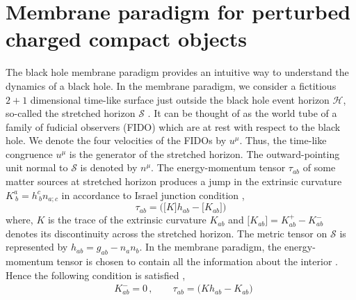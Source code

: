 \documentclass[aps,prd,twocolumn,floatfix,noshowpacs,tightenlines,noshowkeys,superscriptaddress,amsmath,amssymb,
nofootinbib]{revtex4-1}
\renewcommand\[{\begin{equation}}
\renewcommand\]{\end{equation}}
\begin{document}
 
\section{Membrane paradigm for perturbed charged compact objects}\label{Sec_Membrane}


The black hole membrane paradigm provides an intuitive way to understand the dynamics of a black hole. In the membrane paradigm, we consider a fictitious $2+1$ dimensional time-like surface just outside the black hole event horizon 
$\mathcal{H}$, so-called the stretched horizon $\mathcal{S}$ \cite{1982mgm..conf..587D, Thorne, MacDonald:1982zz, PhysRevD.33.915}. It can be thought of as the world tube of a family of fudicial observers (FIDO) which are at rest with respect to the black hole.   We denote the four velocities of the FIDOs by $u^{\mu}$. Thus, the time-like congruence $u^{\mu}$ is the generator of the stretched horizon. The outward-pointing unit normal to $\mathcal{S}$ is denoted by $n^{\mu}$. The energy-momentum tensor $\tau_{ab}$ of some matter sources at stretched horizon produces a jump in the extrinsic curvature $K^a_{~b}=h^c_{~b}n_{a;c}$ in accordance to Israel junction condition \cite{1966NCimB..44....1I,Darmois1927, PhysRevD.58.064011},
\begin{equation}\label{Israel_condi}
	\tau_{ab}=\big(\big[K\big]h_{ab}-\big[K_{ab}\big]\big)
\end{equation}
where, $K$ is the trace of the extrinsic curvature $K_{ab}$ and  $\big[K_{ab}\big]=K^{+}_{ab}-K^{-}_{ab}$ denotes its discontinuity across the stretched horizon. The metric tensor on $\mathcal{S}$ is represented by $h_{ab}=g_{ab}-n_{a}n_{b}$. In the membrane paradigm, the energy-momentum tensor is chosen to contain all the information about the interior \cite{PhysRevD.58.064011}. Hence the following condition is satisfied \cite{PhysRevD.58.064011, Maggio:2020jml}, 
\begin{eqnarray}\label{Membrane_paradigm}
&{K}^{-}_{ab}=0\,,\qquad{\tau}_{ab}=\big(K h_{ab}-K_{ab}\big)~
\end{eqnarray}
\end{document}
